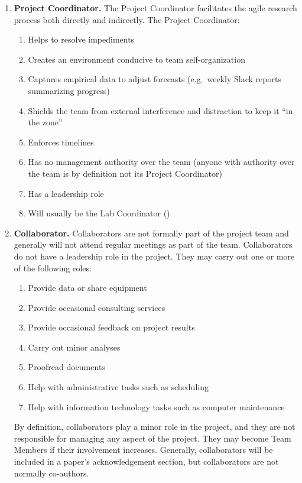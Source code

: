 \documentclass{tufte-book} %
\begin{document}
\begin{enumerate}
\item \textbf{Project Coordinator.} The Project Coordinator facilitates
  the agile research process both directly and indirectly. The Project Coordinator:
\begin{enumerate}
\item Helps to resolve impediments
\item Creates an environment conducive to team self-organization
\item Captures empirical data to adjust forecasts (e.g.\ weekly Slack
  reports summarizing progress)
\item Shields the team from external interference and distraction to
  keep it ``in the zone''
\item Enforces timelines
\item Has no management authority over the team (anyone with authority
  over the team is by definition not its Project
  Coordinator)
\item Has a leadership role
\item Will usually be the Lab Coordinator (\href{mailto:contextualdynamics@gmail.com}{\coordinator})
\end{enumerate}

\item \textbf{Collaborator.}  Collaborators are not formally part of
  the project team and generally will not attend regular meetings as
  part of the team.  Collaborators do not have a leadership role in
  the project.  They may carry out one or more of the
  following roles:
\begin{enumerate}
\item Provide data or share equipment
\item Provide occasional consulting services
\item Provide occasional feedback on project results
\item Carry out minor analyses
\item Proofread documents
\item Help with administrative tasks such as scheduling
\item Help with information technology tasks such as computer
  maintenance

\end{enumerate}
By definition, collaborators play a minor role in the project, and they are not
responsible for managing any aspect of the project.  They may become Team
Members if their involvement increases.  Generally, collaborators will
be included in a paper's acknowledgement section, but collaborators
are not normally co-authors.
\end{enumerate}
\end{document}
